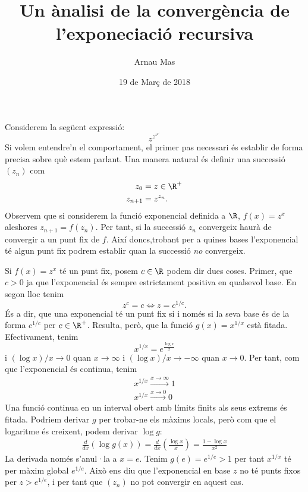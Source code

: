 \documentclass[12pt,a4paper]{article}
\title{\textsf{\textbf{Un ànalisi de la convergència de l'exponeciació recursiva}}}
\author{\textsf{Arnau Mas}}
\date{\textsf{19 de Març de 2018}}
\begin{document}
\maketitle

Considerem la següent expressió:
\begin{equation*}
z^{z^{z^{z^{\iddots}}}}
\end{equation*}
Si volem entendre'n el comportament, el primer pas necessari és establir de forma precisa sobre què estem parlant. Una manera natural és definir una successió \( \left(z_n\right) \) com
\begin{equation*} \label{eq:def recursiva}
	\begin{aligned}
		z_0 &= z \in \R^+\\
		z_{n+1} &= z^{z_n}.
	\end{aligned}
\end{equation*}
Observem que si considerem la funció exponencial definida a \( \R \), \( f(x) = z^x \) aleshores \( z_{n+1} = f(z_n) \). Per tant, si la successió \( z_n \) convergeix haurà de convergir a un punt fix de \( f \). Així doncs,trobant per a quines bases l'exponencial té algun punt fix podrem establir quan la successió \emph{no} convergeix. 

Si \( f(x) = z^x \) té un punt fix, posem \( c \in \R \) podem dir dues coses. Primer, que \( c > 0 \) ja que l'exponencial és sempre estrictament positiva en qualsevol base. En segon lloc tenim
\begin{equation*}
	z^c = c \iff z = c^{1/c}.
\end{equation*}
És a dir, que una exponencial té un punt fix si i només si la seva base és de la forma \( c^{1/c} \) per \( c \in \R^+ \). Resulta, però, que la funció \( g(x) = x^{1/x} \) està fitada. Efectivament, tenim
\begin{equation*} \label{eq:x a la 1/x}
x^{1/x} = e^{\frac{\log{x}}{x}}
\end{equation*}
i \( (\log{x})/x \to 0 \) quan \( x \to \infty \) i \( (\log{x})/x \to -\infty \) quan \( x \to 0 \). Per tant, com que l'exponencial és continua, tenim
\begin{gather*}
x^{1/x} \xrightarrow{ x \to \infty } 1 \\
x^{1/x} \xrightarrow{ x \to 0 } 0
\end{gather*}
Una funció continua en un interval obert amb límits finits als seus extrems és fitada. Podriem derivar \( g \) per trobar-ne els màxims locals, però com que el logaritme és creixent, podem derivar \( \log{g} \):
\begin{align*}
	\frac{d}{dx}\left(\log{g(x)}\right) = \frac{d}{dx}\left(\frac{\log{x}}{x}\right) = \frac{1 - \log{x}}{x^2}
\end{align*}
La derivada només s'anul·la a \( x = e \). Tenim \( g(e) = e^{1/e} > 1 \) per tant \( x^{1/x} \) té per màxim global \( e^{1/e} \). Això ens diu que l'exponencial en base \( z \) no té punts fixos per \( z > e^{1/e} \), i per tant que \( \left(z_n\right) \) no pot convergir en aquest cas.  
\end{document}
